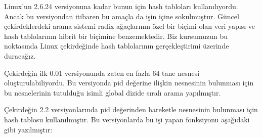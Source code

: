 \documentclass[a4paper,10pt,turkish]{sphinxmanual}
\begin{document}
\sphinxAtStartPar
Linux’un 2.6.24 versiyonuna kadar bunun için hash tabloları kullanılıyordu. Ancak bu versiyondan itibaren
bu amaçla  da işin içine sokulmuştur. Güncel çekirdeklerdeki arama sistemi radix
ağaçlarının özel bir biçimi olan  veri yapısı ve hash tablolarının hibrit bir biçimine benzemektedir.
Biz kursumuzun bu noktasında Linux çekirdeğinde hash tablolarının gerçekleştirimi üzerinde duracağız.

\sphinxAtStartPar
Çekirdeğin ilk 0.01 versiyonunda zaten en fazla 64 tane  nesnesi oluşturulabiliyordu.
Bu versiyonda pid değerine ilişkin  nesnesinin bulunması için bu 
nesnelerinin tutulduğu  isimli global dizide sıralı arama yapılmıştır.

\sphinxAtStartPar
Çekirdeğin 2.2 versiyonlarında pid değerinden hareketle  nesnesinin bulunması için hash
tablosu kullanılmıştır. Bu versiyonlarda bu işi yapan  fonksiyonu aşağıdaki gibi
yazılmıştır:

\begin{sphinxVerbatim}[commandchars=\\\{\}]
\PYG{p}{[}\PYG{p}{]}


\end{sphinxVerbatim}
\end{document}
